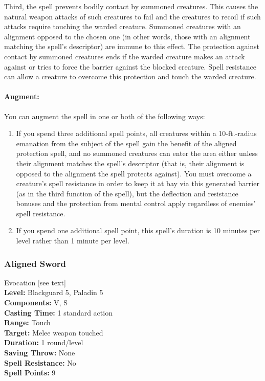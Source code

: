 Third, the spell prevents bodily contact by summoned creatures. 
This causes the natural weapon attacks of such creatures to fail and the creatures to recoil if such attacks require touching the warded creature. 
Summoned creatures with an alignment opposed to the chosen one (in other words, those with an alignment matching the spell's descriptor) are immune to this effect. 
The protection against contact by summoned creatures ends if the warded creature makes an attack against or tries to force the barrier against the blocked creature. 
Spell resistance can allow a creature to overcome this protection and touch the warded creature.

\paragraph{Augment:} You can augment the spell in one or both of the following ways:
\begin{enumerate}
\item If you spend three additional spell points, all creatures within a 10-ft.-radius emanation from the subject of the spell
gain the benefit of the aligned protection spell, and no summoned creatures can enter the area either unless their alignment matches the spell's descriptor (that is, their alignment is opposed to the alignment the spell protects against). 
You must overcome a creature's spell resistance in order to keep it at bay via this generated barrier (as in the third function of the spell), but the deflection and resistance bonuses and the protection from mental control apply regardless of enemies' spell resistance.
\item If you spend one additional spell point, this spell's duration is 10 minutes per level rather than 1 minute per level.
\end{enumerate}
\subsubsection{Aligned Sword}
\label{Spell:AlignedSword}
Evocation [see text]
\\ \textbf{Level:} Blackguard 5, Paladin 5
\\ \textbf{Components:} V, S
\\ \textbf{Casting Time:} 1 standard action
\\ \textbf{Range:} Touch
\\ \textbf{Target:} Melee weapon touched
\\ \textbf{Duration:} 1 round/level
\\ \textbf{Saving Throw:} None
\\ \textbf{Spell Resistance:} No
\\ \textbf{Spell Points:} 9

